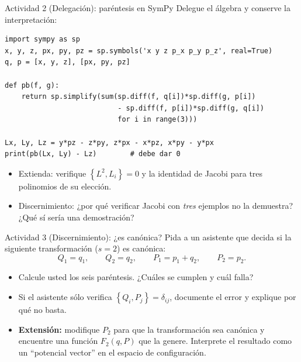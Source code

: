 \documentclass[spanish]{beamer}
\newcommand{\pb}[2]{\left\{#1,#2\right\}}   %
\begin{document}
\begin{frame}[fragile]{Actividad 2 (Delegación): paréntesis en SymPy}
Delegue el álgebra y conserve la interpretación:
\footnotesize
\begin{verbatim}
import sympy as sp
x, y, z, px, py, pz = sp.symbols('x y z p_x p_y p_z', real=True)
q, p = [x, y, z], [px, py, pz]

def pb(f, g):
    return sp.simplify(sum(sp.diff(f, q[i])*sp.diff(g, p[i])
                           - sp.diff(f, p[i])*sp.diff(g, q[i])
                           for i in range(3)))

Lx, Ly, Lz = y*pz - z*py, z*px - x*pz, x*py - y*px
print(pb(Lx, Ly) - Lz)        # debe dar 0
\end{verbatim}
\normalsize
\begin{itemize}
  \item Extienda: verifique $\pb{L^2}{L_i}=0$ y la identidad de Jacobi para tres
        polinomios de su elección.
  \item Discernimiento: ¿por qué verificar Jacobi con \emph{tres} ejemplos no la
        demuestra? ¿Qué sí sería una demostración?
\end{itemize}
\end{frame}

\begin{frame}{Actividad 3 (Discernimiento): ¿es canónica?}
Pida a un asistente que decida si la siguiente transformación ($s=2$) es canónica:
\[
  Q_1 = q_1, \qquad Q_2 = q_2, \qquad P_1 = p_1 + q_2, \qquad P_2 = p_2 .
\]
\begin{itemize}
  \item<2-> Calcule usted los seis paréntesis. ¿Cuáles se cumplen y cuál falla?
  \item<3-> Si el asistente sólo verifica $\pb{Q_i}{P_j} = \delta_{ij}$, documente el
        error y explique por qué no basta.
  \item<4-> \textbf{Extensión:} modifique $P_2$ para que la transformación sea canónica
        y encuentre una función $F_2(q,P)$ que la genere.
        Interprete el resultado como un ``potencial vector'' en el espacio de
        configuración.
\end{itemize}
\end{frame}
\end{document}
